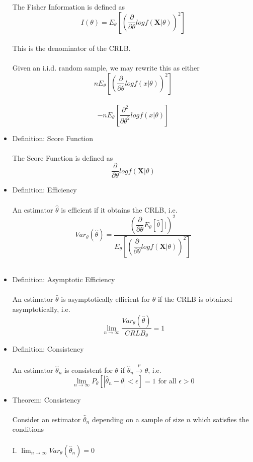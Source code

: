 \documentclass{article}
\begin{document}
\begin{itemize}
    The Fisher Information is defined as\\
    $$I(\theta)=E_\theta[(\dfrac{\partial}{\partial\theta}logf(\textbf{X}|\theta))^2]$$\\
    This is the denominator of the CRLB.\\\\
    Given an i.i.d. random sample, we may rewrite this as either\\
    $$nE_\theta[(\dfrac{\partial}{\partial\theta}logf(x|\theta))^2]$$\\
    $$-nE_\theta[\dfrac{\partial^2}{\partial\theta^2}logf(x|\theta)]$$
    \item Definition: Score Function\\\\
    The Score Function is defined as\\
    $$\dfrac{\partial}{\partial\theta}logf(\textbf{X}|\theta)$$
    \item Definition: Efficiency\\\\
    An estimator $\hat{\theta}$ is efficient if it obtains the CRLB, i.e.\\
    $$Var_\theta(\hat{\theta})=\dfrac{(\dfrac{\partial}{\partial\theta}E_\theta[\hat{\theta}]])^2}{E_\theta[(\dfrac{\partial}{\partial\theta}logf(\textbf{X}|\theta))^2]}$$\\
    \item Definition: Asymptotic Efficiency\\\\
    An estimator $\hat{\theta}$ is asymptotically efficient for $\theta$ if the CRLB is obtained asymptotically, i.e.\\
    $$\lim_{n\rightarrow\infty}\dfrac{Var_\theta(\hat{\theta})}{CRLB_\theta}=1$$
    \item Definition: Consistency\\\\
    An estimator $\hat{\theta}_n$ is consistent for $\theta$ if $\hat{\theta}_n\xrightarrow{p}\theta$, i.e.\\
    $$\lim_{n\rightarrow\infty}P_\theta[|\hat{\theta}_n-\theta|<\epsilon]=1\text{ for all }\epsilon>0$$
    \item Theorem: Consistency\\\\
    Consider an estimator $\hat{\theta}_n$ depending on a sample of size $n$ which satisfies the conditions\\\\
    I. $\lim_{n\rightarrow\infty}Var_\theta(\hat{\theta}_n)=0$\\

\end{itemize}
\end{document}
